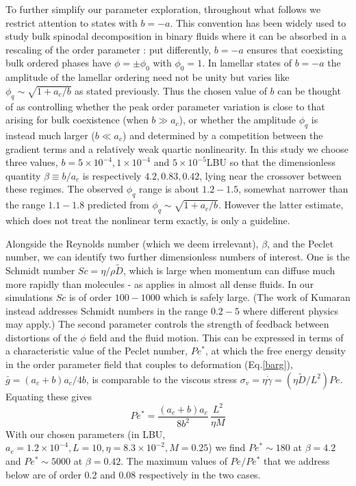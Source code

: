 \documentclass[8.5pt,twoside,twocolumn]{article}
\begin{document}
To further simplify our parameter exploration, throughout what follows we restrict attention to  states with $b = -a$. This convention has been widely used to study bulk spinodal decomposition in binary fluids where it can be absorbed in a rescaling of the order parameter \cite{Kendon01}: put differently, $b=-a$ ensures that coexisting bulk ordered phases have $\phi = \pm\phi_0$ with $\phi_0=1$. In lamellar states of $b= -a$ the amplitude of the lamellar ordering need not be unity but varies like $\phi_q \sim \sqrt{1+a_c/b}$ as stated previously. Thus the chosen value of $b$ can be thought of as controlling whether the peak order parameter variation is close to that arising for bulk coexistence (when $b\gg a_c$), or whether the amplitude $\phi_q$ is instead much larger ($b\ll a_c$) and determined by a competition between the gradient terms and a relatively weak quartic nonlinearity.  In this study we choose three values, $b = 5\times 10^{-4}, 1\times 10^{-4}$ and $5\times 10^{-5}$LBU so that the dimensionless quantity $\beta \equiv b/a_c$ is respectively $4.2,0.83,0.42$, lying near the crossover between these regimes. The observed $\phi_q$ range is about $1.2-1.5$, somewhat narrower than the range $1.1-1.8$ predicted from $\phi_q \sim \sqrt{1+a_c/b}$. However the latter estimate, which does not treat the nonlinear term exactly, is only a guideline.

Alongside the Reynolds number (which we deem irrelevant), $\beta$, and the Peclet number, we can identify two further dimensionless numbers of interest. One is the Schmidt number $Sc = \eta/\rho\tilde D$, which is large when momentum can diffuse much more rapidly than molecules - as applies in almost all dense fluids.  In our simulations $Sc$ is of order $100-1000$ which is safely large. (The work of Kumaran \cite{Kumaran2011} instead addresses Schmidt numbers in the range $0.2-5$ where different physics may apply.) The second parameter controls the strength of feedback between distortions of the $\phi$ field and the fluid motion. This 
can be expressed in terms of a characteristic value of the Peclet number, $Pe^*$, at which the free energy density in the order parameter field that couples to deformation (Eq.\ref{barg}), $\bar g=(a_c+b)a_c/4b$, is comparable to the viscous stress $\sigma_v=\eta\dot\gamma = (\eta \tilde D/L^2)Pe$. Equating these gives
\begin{equation}
Pe^* =\frac{(a_c+b)a_c}{8b^2}\,\frac{L^2}{\eta M}\label{pestar}
\end{equation}
With our chosen parameters (in LBU, $a_c=1.2\times 10^{-4}, L = 10, \eta = 8.3\times 10^{-2}, M = 0.25$) we find $Pe^* \sim 180$ at $\beta = 4.2$ and $Pe^* \sim 5000$ at $\beta = 0.42$. The maximum values of $Pe/Pe^*$ that we address below are of order 0.2 and 0.08 respectively in the two cases.
\end{document}
